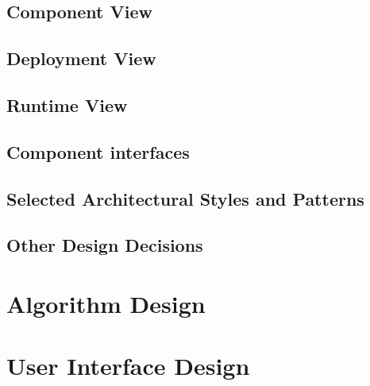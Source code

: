 \documentclass[11pt,a4paper]{report}
\begin{document}
\section{Component View}
\section{Deployment View}
\section{Runtime View}
\section{Component interfaces}
\section{Selected Architectural Styles and Patterns}
\section{Other Design Decisions}
\chapter{Algorithm Design}
\chapter{User Interface Design}
\end{document}
